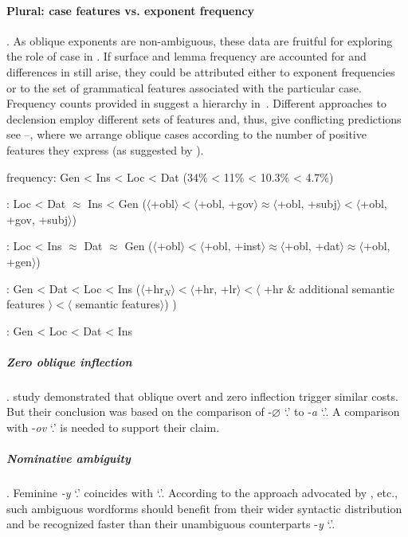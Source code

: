 \documentclass[output=paper, modfonts,newtxmath,hidelinks]{langscibook}
\begin{document}
\paragraph*{Plural: case features vs. exponent frequency}. As oblique  exponents are non-ambiguous, these data are fruitful for exploring the role of case in  . If surface and lemma frequency are accounted for and differences in   still arise, they could be attributed either to exponent frequencies or to the set of grammatical features associated with the particular case. Frequency counts provided in \citet{samojlova2014frequencies} suggest a hierarchy in~. Different approaches to  declension employ different sets of features and, thus, give conflicting predictions see --, where we arrange oblique cases according to the number of positive features they express (as suggested by \citealt{clahsen2001mental}).

\ea \ea \label{ex:freqpl} frequency: Gen < Ins < Loc < Dat (34\% < 11\% < 10.3\% < 4.7\%)
    
    \ex \label{ex:mueller}  \citealt{muller2004decomposing}: Loc < Dat $\approx$ Ins < Gen ($\langle$+obl$\rangle < \langle$+obl, +gov$\rangle \approx \langle$+obl, +subj$\rangle < \langle$+obl, +gov, +subj$\rangle$)
    
    \ex \label{ex:wiese}	\citealt{wiese2004categories}:  Loc < Ins $\approx$ Dat $\approx$ Gen ($\langle$+obl$\rangle < \langle$+obl, +inst$\rangle \approx \langle$+obl, +dat$\rangle \approx \langle$+obl, +gen$\rangle$)
    
    \ex \label{ex:wunderlich}	\citealt{wunderlich1996minimalist}: Gen < Dat < Loc < Ins ($\langle$+hr$_N \rangle < \langle$+hr, +lr$\rangle < \langle$ +hr \& additional semantic features $\rangle < \langle$ semantic features$\rangle$) 
)
    
    \ex \label{ex:caha} \citealt{caha2008case}: Gen < Loc < Dat < Ins
    \z
\z

\subparagraph*{{Zero oblique inflection}}.  study demonstrated that oblique overt and zero inflection trigger similar  costs. But their conclusion was based on the comparison of  -$\varnothing$ `\genn.\pl' to  -\textit{a} `\genn.\sg'. A comparison with  -\textit{ov} `\genn.\pl' is needed to support their claim.

\subparagraph*{{Nominative ambiguity}}. Feminine \textit{-y} `\nomm.\pl' coincides with `\genn.\sg'. According to the approach advocated by \citet{kostic1991informational}, etc., such ambiguous wordforms should benefit from their wider syntactic distribution and be recognized faster than their unambiguous  counterparts -\textit{y} `\nomm.\pl'.
\end{document}
